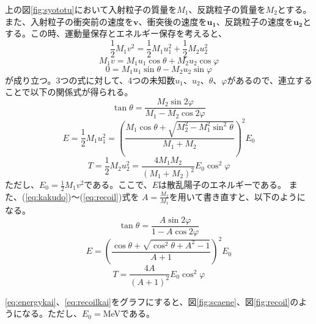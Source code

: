 \documentclass[a4paper,11pt,dvipdfmx]{jsarticle}
\begin{document}
上の図\ref{fig:syototu}において入射粒子の質量を$M_{1}$、反跳粒子の質量を$M_{2}$とする。また、入射粒子の衝突前の速度を$\bm{v}$、衝突後の速度を$\bm{u_{1}}$、反跳粒子の速度を$\bm{u_{2}}$とする。この時、運動量保存とエネルギー保存を考えると、
\begin{equation}
\frac{1}{2}M_{1}v^{2} = \frac{1}{2}M_{1}u_{1}^{2} + \frac{1}{2}M_{2}u_{2}^{2}
\end{equation}
\begin{equation}
M_{1}v = M_{1}u_{1}\cos\theta+M_{2}u_{2}\cos\varphi
\end{equation}
\begin{equation}
0 = M_{1}u_{1}\sin\theta-M_{2}u_{2}\sin\varphi
\end{equation}
が成り立つ。3つの式に対して、4つの未知数$u_{1}$、$u_{2}$、$\theta$、$\varphi$があるので、連立することで以下の関係式が得られる。
\begin{equation}\label{eq:kakudo}
\tan\theta = \frac{M_{2}\sin2\varphi}{M_{1}-M_{2}\cos2\varphi}   
\end{equation}
\begin{equation}
E = \frac{1}{2}M_{1}u_{1}^{2} = \left(\frac{M_{1}\cos\theta + \sqrt{M_{2}^{2} - M_{1}^{2}\sin^2\theta}}{M_{1}+M_{2}}\right)^{2}E_{0}
\label{eq:energy}
\end{equation}
\begin{equation}\label{eq:recoil}
T = \frac{1}{2}M_{2}u_{2}^{2} = \frac{4M_{1}M_{2}}{\left(M_{1}+M_{2}\right)^{2}}E_{0}\cos^2\varphi
\end{equation}
ただし、$E_{0} = \frac{1}{2}M_{1}v^{2}$である。ここで、$E$は散乱陽子のエネルギーである。
また、(\ref{eq:kakudo})～(\ref{eq:recoil})式を $A = \frac{M_{2}}{M_{1}}$を用いて書き直すと、以下のようになる。
\begin{equation}\label{eq:kakudokai}
\tan\theta = \frac{A\sin2\varphi}{1 - A\cos2\varphi}   
\end{equation}
\begin{equation}
E  = \left(\frac{\cos\theta + \sqrt{\cos^2\theta + A^{2} -1}}{A + 1}\right)^{2}E_{0}
\label{eq:energykai}
\end{equation}
\begin{equation}\label{eq:recoilkai}
T = \frac{4A}{\left(A + 1\right)^{2}}E_{0}\cos^2\varphi
\end{equation}

\eqref{eq:energykai}、\eqref{eq:recoilkai}をグラフにすると、図\ref{fig:scaene}、図\ref{fig:recoil}のようになる。ただし、$E_{0}=$\;MeVである。
\end{document}
